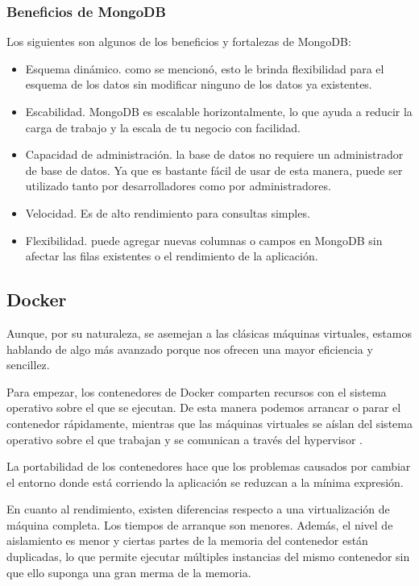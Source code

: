 \subsubsection{Beneficios de MongoDB}

Los siguientes son algunos de los beneficios y fortalezas de MongoDB:

\begin{itemize}
  \item Esquema dinámico. como se mencionó, esto le brinda flexibilidad para el esquema de los datos sin modificar ninguno de los datos ya existentes.
  \item Escabilidad. MongoDB es escalable horizontalmente, lo que ayuda a reducir la carga de trabajo y la escala de tu negocio con facilidad.
  \item Capacidad de administración. la base de datos no requiere un administrador de base de datos. Ya que es bastante fácil de usar de esta manera, puede ser utilizado tanto por desarrolladores como por administradores.
  \item Velocidad. Es de alto rendimiento para consultas simples.
  \item Flexibilidad. puede agregar nuevas columnas o campos en MongoDB sin afectar las filas existentes o el rendimiento de la aplicación.
\end{itemize}

\subsection{Docker}

Aunque, por su naturaleza, se asemejan a las clásicas máquinas virtuales, estamos hablando de algo más avanzado porque nos ofrecen una mayor eficiencia y sencillez.

Para empezar, los contenedores de Docker comparten recursos con el sistema operativo sobre el que se ejecutan. De esta manera podemos arrancar o parar el contenedor rápidamente, mientras que las máquinas virtuales se aíslan del sistema operativo sobre el que trabajan y se comunican a través del hypervisor \cite{docker2}.

La portabilidad de los contenedores hace que los problemas causados por cambiar el entorno donde está corriendo la aplicación se reduzcan a la mínima expresión.

En cuanto al rendimiento, existen diferencias respecto a una virtualización de máquina completa. Los tiempos de arranque son menores. Además, el nivel de aislamiento es menor y ciertas partes de la memoria del contenedor están duplicadas, lo que permite ejecutar múltiples instancias del mismo contenedor sin que ello suponga una gran merma de la memoria.

